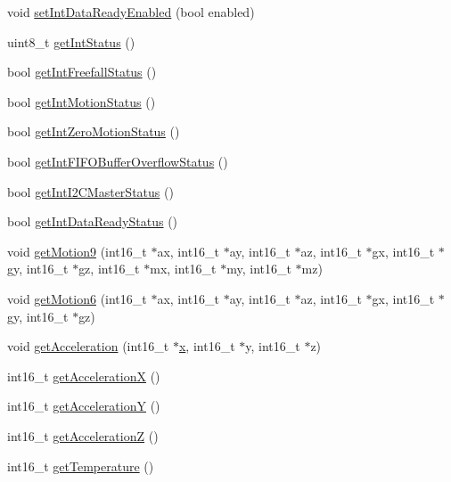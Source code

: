\begin{DoxyCompactItemize}
void \hyperlink{classMPU6050_a67a11be7fc7ab6b1186469b94ea33dda}{set\+Int\+Data\+Ready\+Enabled} (bool enabled)
\item 
uint8\+\_\+t \hyperlink{classMPU6050_a550a735623cb1de950c72cd6931ee804}{get\+Int\+Status} ()
\item 
bool \hyperlink{classMPU6050_a06bbc2116235b7cc5e28c877e0576749}{get\+Int\+Freefall\+Status} ()
\item 
bool \hyperlink{classMPU6050_ac0c0836aa0d237cac92d11591efd0d9f}{get\+Int\+Motion\+Status} ()
\item 
bool \hyperlink{classMPU6050_afa73a5ffdc423736ae88702a469ba3a0}{get\+Int\+Zero\+Motion\+Status} ()
\item 
bool \hyperlink{classMPU6050_aa31427588f059c69d93ddb00ba257b12}{get\+Int\+F\+I\+F\+O\+Buffer\+Overflow\+Status} ()
\item 
bool \hyperlink{classMPU6050_a31d6c2b03fc2d6ce82d67d142f316851}{get\+Int\+I2\+C\+Master\+Status} ()
\item 
bool \hyperlink{classMPU6050_ae4f434eb51a15b536e2e8f89a776872b}{get\+Int\+Data\+Ready\+Status} ()
\item 
void \hyperlink{classMPU6050_aabfd2920e748016383e8124a4b32ad31}{get\+Motion9} (int16\+\_\+t $\ast$ax, int16\+\_\+t $\ast$ay, int16\+\_\+t $\ast$az, int16\+\_\+t $\ast$gx, int16\+\_\+t $\ast$gy, int16\+\_\+t $\ast$gz, int16\+\_\+t $\ast$mx, int16\+\_\+t $\ast$my, int16\+\_\+t $\ast$mz)
\item 
void \hyperlink{classMPU6050_a574d3093dc131e4251a9b37adf208ca7}{get\+Motion6} (int16\+\_\+t $\ast$ax, int16\+\_\+t $\ast$ay, int16\+\_\+t $\ast$az, int16\+\_\+t $\ast$gx, int16\+\_\+t $\ast$gy, int16\+\_\+t $\ast$gz)
\item 
void \hyperlink{classMPU6050_a658dfc7e35b7fdba360a75f137bde33a}{get\+Acceleration} (int16\+\_\+t $\ast$\hyperlink{qualification__task_8cpp_a6150e0515f7202e2fb518f7206ed97dc}{x}, int16\+\_\+t $\ast$y, int16\+\_\+t $\ast$z)
\item 
int16\+\_\+t \hyperlink{classMPU6050_aa68475158c22128e5459c4c5e19439dc}{get\+AccelerationX} ()
\item 
int16\+\_\+t \hyperlink{classMPU6050_a27240b90d3e03c85b7a619b794bb1756}{get\+AccelerationY} ()
\item 
int16\+\_\+t \hyperlink{classMPU6050_acf5f5a20c10d99a1bdedf139f897bfdf}{get\+AccelerationZ} ()
\item 
int16\+\_\+t \hyperlink{classMPU6050_aedfa4f1e6507f48c0a09545345a87875}{get\+Temperature} ()
\item 

\end{DoxyCompactItemize}
